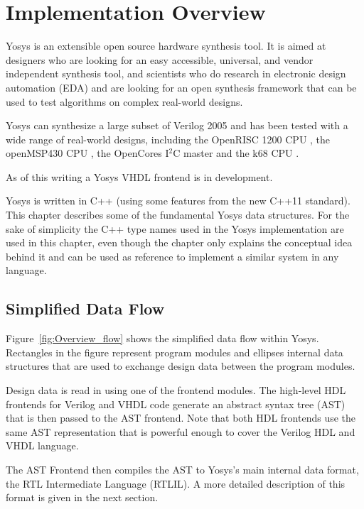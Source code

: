 
\chapter{Implementation Overview}
\label{chapter:overview}

Yosys is an extensible open source hardware synthesis tool. It is aimed at
designers who are looking for an easy accessible, universal, and vendor
independent synthesis tool, and scientists who do research in
electronic design automation (EDA) and are looking for an open synthesis
framework that can be used to test algorithms on complex real-world designs.

Yosys can synthesize a large subset of Verilog 2005 and has been tested with a
wide range of real-world designs, including the OpenRISC 1200 CPU
, the openMSP430 CPU , the
OpenCores I$^2$C master  and the k68 CPU .

As of this writing a Yosys VHDL frontend is in development.

Yosys is written in C++ (using some features from the new C++11 standard). This
chapter describes some of the fundamental Yosys data structures. For the sake
of simplicity the C++ type names used in the Yosys implementation are used in
this chapter, even though the chapter only explains the conceptual idea behind
it and can be used as reference to implement a similar system in any language.

\section{Simplified Data Flow}

Figure~\ref{fig:Overview_flow} shows the simplified data flow within Yosys.
Rectangles in the figure represent program modules and ellipses internal
data structures that are used to exchange design data between the program
modules.

Design data is read in using one of the frontend modules. The high-level HDL
frontends for Verilog and VHDL code generate an abstract syntax tree (AST) that
is then passed to the AST frontend. Note that both HDL frontends use the same
AST representation that is powerful enough to cover the Verilog HDL and VHDL
language.

The AST Frontend then compiles the AST to Yosys's main internal data format,
the RTL Intermediate Language (RTLIL). A more detailed description of this format
is given in the next section.

